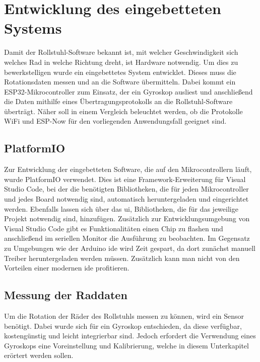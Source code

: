 \chapter{Entwicklung des eingebetteten Systems}
Damit der Rollstuhl-Software bekannt ist, mit welcher Geschwindigkeit sich welches Rad in welche Richtung dreht, ist Hardware notwendig.
Um dies zu bewerkstelligen wurde ein eingebettetes System entwicklet. Dieses muss die Rotationsdaten messen und an die Software übermitteln.
Dabei kommt ein ESP32-Mikrocontroller zum Einsatz, der ein Gyroskop ausliest und anschließend die Daten mithilfe eines Übertragungsprotokolls an die Rollstuhl-Software überträgt.
Näher soll in einem Vergleich beleuchtet werden, ob die Protokolle WiFi und ESP-Now für den vorliegenden Anwendungsfall geeignet sind.

\section{PlatformIO}
Zur Entwicklung der eingebetteten Software, die auf den Mikrocontrollern läuft, wurde PlatformIO verwendet.
Dies ist eine Framework-Erweiterung für Visual Studio Code, bei der die benötigten Bibliotheken, die für jeden Mikrocontroller und jedes Board notwendig sind, automatisch heruntergeladen und eingerichtet werden.
Ebenfalls lassen sich über das \ac{ui}, Bibliotheken, die für das jeweilige Projekt notwendig sind, hinzufügen.
Zusätzlich zur Entwicklungsumgebung von Visual Studio Code gibt es Funktionalitäten einen Chip zu flashen und anschließend im seriellen Monitor die Ausführung zu beobachten.
Im Gegensatz zu Umgebungen wie der Arduino \ac{ide} wird Zeit gespart, da dort zunächst manuell Treiber heruntergeladen werden müssen.
Zusätzlich kann man nicht von den Vorteilen einer modernen \ac{ide} profitieren.

\section{Messung der Raddaten}
Um die Rotation der Räder des Rollstuhls messen zu können, wird ein Sensor benötigt.
Dabei wurde sich für ein Gyroskop entschieden, da diese verfügbar, kostengünstig und leicht integrierbar sind.
Jedoch erfordert die Verwendung eines Gyroskops eine Voreinstellung und Kalibrierung, welche in diesem Unterkapitel erörtert werden sollen.

